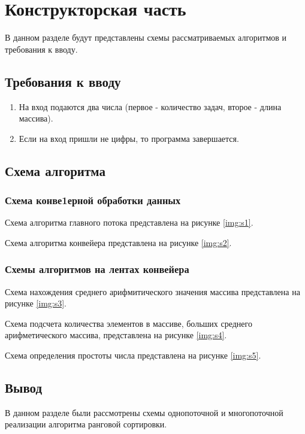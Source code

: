 \chapter{Конструкторская часть}
В данном разделе будут представлены схемы рассматриваемых алгоритмов и требования к вводу.

\section{Требования к вводу}
\begin{enumerate}
	\item На вход подаются два числа (первое - количество задач, второе - длина массива).
	\item Если на вход пришли не цифры, то программа завершается.
\end{enumerate}

\section{Схема алгоритма}

\subsection{Схема конве1ерной обработки данных}
Схема алгоритма главного потока представлена на рисунке \ref{img:s1}.


\clearpage

Схема алгоритма конвейера представлена на рисунке \ref{img:s2}.


\clearpage


\subsection{Схемы алгоритмов на лентах конвейера}

Схема нахождения среднего арифмитического значения массива представлена на рисунке \ref{img:s3}.



\clearpage


Схема подсчета количества элементов в массиве, больших среднего арифметического массива, представлена на рисунке \ref{img:s4}.


\clearpage


Схема определения простоты числа представлена на рисунке \ref{img:s5}.



\section{Вывод}

В данном разделе были рассмотрены схемы однопоточной и
многопоточной реализации алгоритма ранговой сортировки.
